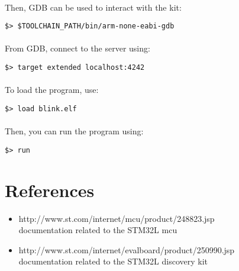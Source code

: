 \documentclass[a4paper, 11pt]{article}
\begin{document}
\paragraph{}
Then, GDB can be used to interact with the kit:\\
\begin{small}
\begin{lstlisting}[frame=tb]
$> $TOOLCHAIN_PATH/bin/arm-none-eabi-gdb
\end{lstlisting}
\end{small}

\paragraph{}
From GDB, connect to the server using:\\
\begin{small}
\begin{lstlisting}[frame=tb]
$> target extended localhost:4242
\end{lstlisting}
\end{small}

\paragraph{}
To load the program, use:\\
\begin{small}
\begin{lstlisting}[frame=tb]
$> load blink.elf
\end{lstlisting}
\end{small}

\paragraph{}
Then, you can run the program using:\\
\begin{small}
\begin{lstlisting}[frame=tb]
$> run
\end{lstlisting}
\end{small}


\newpage
\section{References}
\begin{itemize}
\item http://www.st.com/internet/mcu/product/248823.jsp\\
  documentation related to the STM32L mcu
\item http://www.st.com/internet/evalboard/product/250990.jsp\\
  documentation related to the STM32L discovery kit
\end{itemize}
\end{document}
